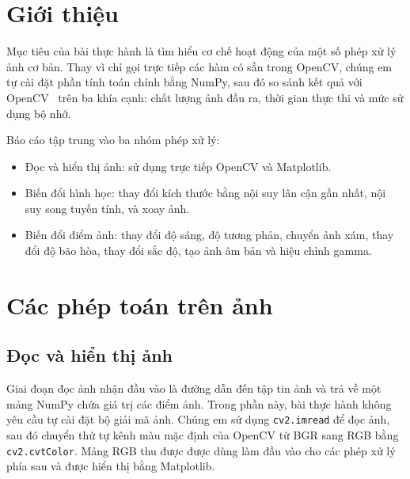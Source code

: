 \documentclass[12pt]{article}
\numberwithin{equation}{section}
\begin{document}
\fontsize{12pt}{15pt}\selectfont
\setlength{\parskip}{2pt}



\tableofcontents
\newpage


\section{Giới thiệu}

Mục tiêu của bài thực hành là tìm hiểu cơ chế hoạt động của một số phép xử lý
ảnh cơ bản. Thay vì chỉ gọi trực tiếp các hàm có sẵn trong OpenCV, chúng em tự
cài đặt phần tính toán chính bằng NumPy, sau đó so sánh kết quả với OpenCV~\cite{opencv}
trên ba khía cạnh: chất lượng ảnh đầu ra, thời gian thực thi và mức sử dụng bộ
nhớ.

Báo cáo tập trung vào ba nhóm phép xử lý:
\begin{itemize}
  \item Đọc và hiển thị ảnh: sử dụng trực tiếp OpenCV và Matplotlib.
  \item Biến đổi hình học: thay đổi kích thước bằng nội suy lân cận gần nhất,
  nội suy song tuyến tính, và xoay ảnh.
  \item Biến đổi điểm ảnh: thay đổi độ sáng, độ tương phản, chuyển ảnh xám,
  thay đổi độ bão hòa, thay đổi sắc độ, tạo ảnh âm bản và hiệu chỉnh gamma.
\end{itemize}

\section{Các phép toán trên ảnh}

\subsection{Đọc và hiển thị ảnh}

Giai đoạn đọc ảnh nhận đầu vào là đường dẫn đến tập tin ảnh và trả về một mảng
NumPy chứa giá trị các điểm ảnh. Trong phần này, bài thực hành không yêu cầu tự
cài đặt bộ giải mã ảnh. Chúng em sử dụng \texttt{cv2.imread} để đọc ảnh, sau đó
chuyển thứ tự kênh màu mặc định của OpenCV từ BGR sang RGB bằng
\texttt{cv2.cvtColor}. Mảng RGB thu được được dùng làm đầu vào cho các phép xử
lý phía sau và được hiển thị bằng Matplotlib.
\end{document}
